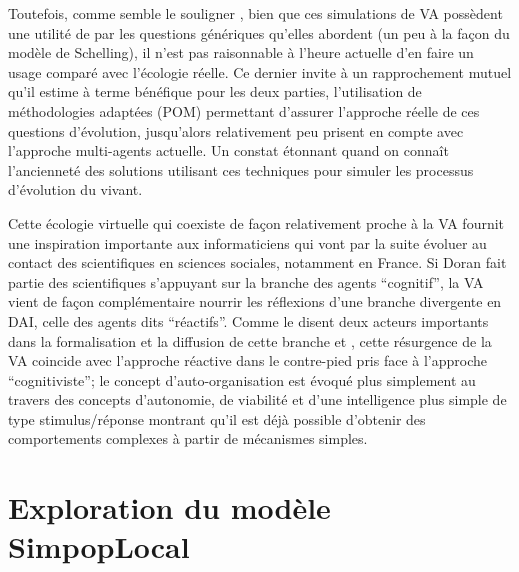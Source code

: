 
Toutefois, comme semble le souligner \textcite{Dorin2008}, bien que ces simulations de VA possèdent une utilité de par les questions génériques qu'elles abordent (un peu à la façon du modèle de Schelling), il n'est pas raisonnable à l'heure actuelle d'en faire un usage comparé avec l'écologie réelle. Ce dernier invite à un rapprochement mutuel qu'il estime à terme bénéfique pour les deux parties, l'utilisation de méthodologies adaptées (POM) permettant d'assurer l'approche réelle de ces questions d'évolution, jusqu'alors relativement peu prisent en compte avec l'approche multi-agents actuelle. Un constat étonnant quand on connaît l'ancienneté des solutions utilisant ces techniques pour simuler les processus d'évolution du vivant.

Cette écologie virtuelle qui coexiste de façon relativement proche à la VA fournit une inspiration importante aux informaticiens qui vont par la suite évoluer au contact des scientifiques en sciences sociales, notamment en France. Si Doran fait partie des scientifiques s'appuyant sur la branche des agents \enquote{cognitif}, la VA vient de façon complémentaire nourrir les réflexions d'une branche divergente en DAI, celle des agents dits \enquote{réactifs}. Comme le disent deux acteurs importants dans la formalisation et la diffusion de cette branche \autocite[31-32]{Ferber1995} et \textcite[7-10]{Drogoul1993}, cette résurgence de la VA coincide avec l'approche réactive dans le contre-pied pris face à l'approche \enquote{cognitiviste}; le concept d'auto-organisation est évoqué plus simplement au travers des concepts d'autonomie, de viabilité et d'une intelligence plus simple de type stimulus/réponse montrant qu'il est déjà possible d'obtenir des comportements complexes à partir de mécanismes simples.

\printbibliography[heading=subbibliography]

\chapter{Exploration du modèle SimpopLocal}

